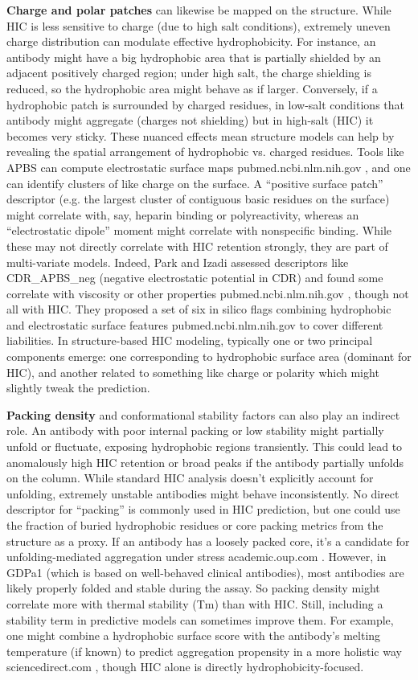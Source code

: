 \documentclass[12pt]{article}
\begin{document}
\textbf{Charge and polar patches} can likewise be mapped on the structure. While HIC is less sensitive to charge (due to high salt conditions), extremely uneven charge distribution can modulate effective hydrophobicity. For instance, an antibody might have a big hydrophobic area that is partially shielded by an adjacent positively charged region; under high salt, the charge shielding is reduced, so the hydrophobic area might behave as if larger. Conversely, if a hydrophobic patch is surrounded by charged residues, in low-salt conditions that antibody might aggregate (charges not shielding) but in high-salt (HIC) it becomes very sticky. These nuanced effects mean structure models can help by revealing the spatial arrangement of hydrophobic vs. charged residues. Tools like APBS can compute electrostatic surface maps
pubmed.ncbi.nlm.nih.gov
, and one can identify clusters of like charge on the surface. A “positive surface patch” descriptor (e.g. the largest cluster of contiguous basic residues on the surface) might correlate with, say, heparin binding or polyreactivity, whereas an “electrostatic dipole” moment might correlate with nonspecific binding. While these may not directly correlate with HIC retention strongly, they are part of multi-variate models. Indeed, Park and Izadi assessed descriptors like CDR_APBS_neg (negative electrostatic potential in CDR) and found some correlate with viscosity or other properties
pubmed.ncbi.nlm.nih.gov
, though not all with HIC. They proposed a set of six in silico flags combining hydrophobic and electrostatic surface features
pubmed.ncbi.nlm.nih.gov
 to cover different liabilities. In structure-based HIC modeling, typically one or two principal components emerge: one corresponding to hydrophobic surface area (dominant for HIC), and another related to something like charge or polarity which might slightly tweak the prediction.

\textbf{Packing density} and conformational stability factors can also play an indirect role. An antibody with poor internal packing or low stability might partially unfold or fluctuate, exposing hydrophobic regions transiently. This could lead to anomalously high HIC retention or broad peaks if the antibody partially unfolds on the column. While standard HIC analysis doesn’t explicitly account for unfolding, extremely unstable antibodies might behave inconsistently. No direct descriptor for “packing” is commonly used in HIC prediction, but one could use the fraction of buried hydrophobic residues or core packing metrics from the structure as a proxy. If an antibody has a loosely packed core, it’s a candidate for unfolding-mediated aggregation under stress
academic.oup.com
. However, in GDPa1 (which is based on well-behaved clinical antibodies), most antibodies are likely properly folded and stable during the assay. So packing density might correlate more with thermal stability (Tm) than with HIC. Still, including a stability term in predictive models can sometimes improve them. For example, one might combine a hydrophobic surface score with the antibody’s melting temperature (if known) to predict aggregation propensity in a more holistic way
sciencedirect.com
, though HIC alone is directly hydrophobicity-focused.
\end{document}
